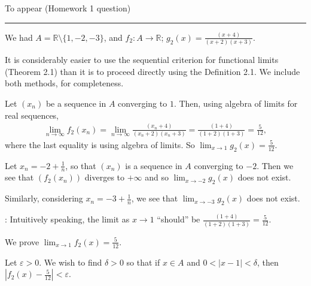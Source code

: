 \documentclass[letterpaper,10pt,english]{jupyterBook}
\begin{document}
\sphinxAtStartPar
{\hyperref[\detokenize{Problems:id3}]{}} To appear (Homework 1 question)


\bigskip\hrule\bigskip


\sphinxAtStartPar
{\hyperref[\detokenize{Problems:id4}]{}} We had \(A= \mathbb{R} \setminus \{1, -2, -3\}\), and \(f_2:A\to\mathbb{R}\); \(\displaystyle g_{2}(x)= \frac{(x + 4)}{(x + 2)(x + 3)}\).

\sphinxAtStartPar
It is considerably easier to use the sequential criterion for functional limits (Theorem 2.1) than it is to proceed directly using the Definition 2.1. We include both methods, for completeness.

\sphinxAtStartPar
{} 
Let \((x_n)\) be a sequence in \(A\) converging to \(1\). Then, using algebra of limits for real sequences,
\begin{equation*}
\begin{split}
\lim_{n\to\infty}f_2(x_n)= \lim_{n\to\infty} \frac{(x_n + 4)}{(x_n + 2)(x_n + 3)} =  \frac{(1 + 4)}{(1 + 2)(1 + 3)} = \frac{5}{12},
\end{split}
\end{equation*}
\sphinxAtStartPar
where the last equality is using algebra of limits. So \(\displaystyle\lim_{x \rightarrow 1}g_{2}(x) = \frac{5}{12}\).

\sphinxAtStartPar
Let \(x_n=-2 + \frac{1}{n}\), so that \((x_n)\) is a sequence in \(A\) converging to \(-2\). Then we see that \((f_2(x_n))\) diverges to \(+\infty\) and so \(\lim_{x \rightarrow -2}g_{2}(x)\)  does not exist.

\sphinxAtStartPar
Similarly, considering \(x_n=-3 + \frac{1}{n}\),  we see that \(\lim_{x \rightarrow -3}g_{2}(x)\) does not exist.

\sphinxAtStartPar
{}: 
Intuitively speaking, the limit as \(x\rightarrow 1\) “should” be \(\frac{(1 + 4)}{(1 + 2)(1 + 3)}=\frac{5}{12}\).

\sphinxAtStartPar
We prove \(\lim_{x\rightarrow 1}f_2(x) = \frac{5}{12}\).

\sphinxAtStartPar
Let \(\varepsilon>0\). We wish to find \(\delta>0\) so that if \(x\in A\) and \(0<|x-1|<\delta\), then \(\left|f_2(x)-\frac{5}{12}\right| <\varepsilon\).
\end{document}

